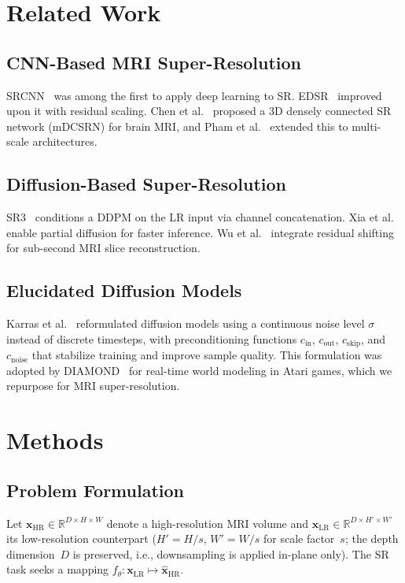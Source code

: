 \documentclass[10pt,journal]{IEEEtran}
\begin{document}
\section{Related Work}
\label{sec:related}

\subsection{CNN-Based MRI Super-Resolution}
SRCNN~\cite{b9} was among the first to apply deep learning to SR.
EDSR~\cite{b10} improved upon it with residual scaling.
Chen et al.~\cite{b6} proposed a 3D densely connected SR network
(mDCSRN) for brain MRI, and Pham et al.~\cite{b7} extended this to
multi-scale architectures.

\subsection{Diffusion-Based Super-Resolution}
SR3~\cite{b3} conditions a DDPM on the LR input via channel
concatenation.  Xia et al.~\cite{b12} enable partial diffusion for
faster inference.  Wu et al.~\cite{b13} integrate residual shifting
for sub-second MRI slice reconstruction.

\subsection{Elucidated Diffusion Models}
Karras et al.~\cite{b18} reformulated diffusion models using a
continuous noise level $\sigma$ instead of discrete timesteps, with
preconditioning functions $c_\text{in}$, $c_\text{out}$,
$c_\text{skip}$, and $c_\text{noise}$ that stabilize training and
improve sample quality.  This formulation was adopted by
DIAMOND~\cite{b20} for real-time world modeling in Atari games,
which we repurpose for MRI super-resolution.

\section{Methods}
\label{sec:methods}

\subsection{Problem Formulation}

Let $\mathbf{x}_\text{HR} \in \mathbb{R}^{D \times H \times W}$
denote a high-resolution MRI volume and
$\mathbf{x}_\text{LR} \in \mathbb{R}^{D \times H' \times W'}$
its low-resolution counterpart ($H' = H/s$, $W' = W/s$ for scale
factor~$s$; the depth dimension~$D$ is preserved, i.e., downsampling
is applied in-plane only).  The SR task seeks a mapping
$f_\theta: \mathbf{x}_\text{LR} \mapsto \hat{\mathbf{x}}_\text{HR}$.
\end{document}
